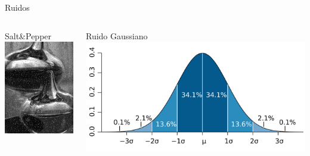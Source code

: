\documentclass{beamer}
\begin{document}
\begin{frame}{Ruidos}

\begin{columns}
\column[t]{5cm}
\begin{center}
Salt\&Pepper\\
\includegraphics[scale=0.30]{./.Presentation/NoiseSP.png}
\end{center}

\column[t]{5cm}
\begin{center}
Ruido Gaussiano\\


\includegraphics[scale=0.1]{./.Presentation/Standard_deviation_diagram.png}
\end{center}
\end{columns}

\end{frame}
\end{document}
